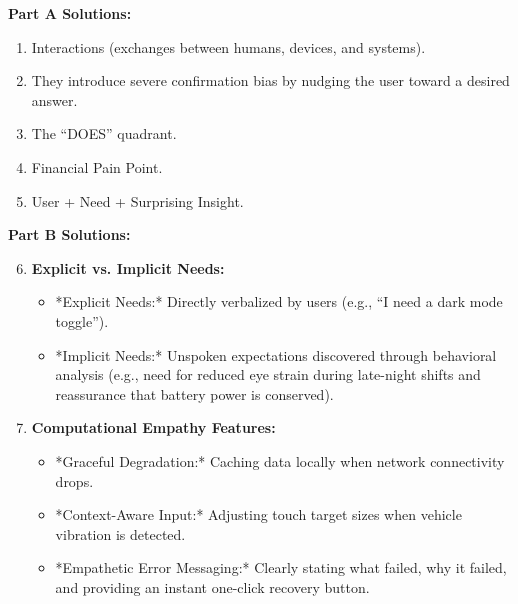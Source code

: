 \begin{solutionbox}
\textbf{Part A Solutions:}
\begin{enumerate}[leftmargin=1.2em, itemsep=2pt]
    \item Interactions (exchanges between humans, devices, and systems).
    \item They introduce severe confirmation bias by nudging the user toward a desired answer.
    \item The ``DOES'' quadrant.
    \item Financial Pain Point.
    \item User + Need + Surprising Insight.
\end{enumerate}

\textbf{Part B Solutions:}
\begin{enumerate}[leftmargin=1.2em, itemsep=3pt]
    \setcounter{enumi}{5}
    \item \textbf{Explicit vs. Implicit Needs:}
    \begin{itemize}
        \item *Explicit Needs:* Directly verbalized by users (e.g., ``I need a dark mode toggle'').
        \item *Implicit Needs:* Unspoken expectations discovered through behavioral analysis (e.g., need for reduced eye strain during late-night shifts and reassurance that battery power is conserved).
    \end{itemize}
    \item \textbf{Computational Empathy Features:}
    \begin{itemize}
        \item *Graceful Degradation:* Caching data locally when network connectivity drops.
        \item *Context-Aware Input:* Adjusting touch target sizes when vehicle vibration is detected.
        \item *Empathetic Error Messaging:* Clearly stating what failed, why it failed, and providing an instant one-click recovery button.
    \end{itemize}
\end{enumerate}


\end{solutionbox}
